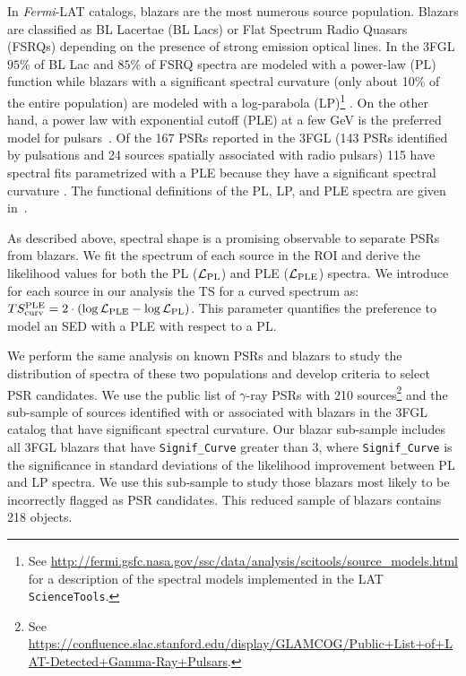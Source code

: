 \documentclass[iop]{emulateapj}
\begin{document}
In {\it Fermi}-LAT catalogs, blazars are the most numerous source
population.  Blazars are classified as BL Lacertae (BL Lacs) or Flat
Spectrum Radio Quasars (FSRQs) depending on the presence of strong
emission optical lines.  In the 3FGL $95\%$ of BL Lac and $85\%$ of
FSRQ spectra are modeled with a power-law (PL) function while blazars
with a significant spectral curvature (only about 10\% of the entire
population) are modeled with a log-parabola (LP)\footnote[7]{See
  \url{http://fermi.gsfc.nasa.gov/ssc/data/analysis/scitools/source\_models.html}
  for a description of the spectral models implemented in the LAT
  \texttt{ScienceTools}.}  
\citep[see, e.g.,][for a characterization of the {\it Fermi}
  blazar
  population]{2012ApJ...751..108A,DiMauro:2013zfa, Ackermann:2015yfk,Ghisellini:2017ico}. On
the other hand, a power law with exponential cutoff (PLE) at a few GeV
is the preferred model for pulsars~\citep{2013ApJS..208...17A}.  Of
the 167 PSRs reported in the 3FGL (143 PSRs identified by pulsations
and 24 sources spatially associated with radio pulsars) 115 have
spectral fits parametrized with a PLE because they have a significant
spectral curvature \citep[see, e.g.,][for a characterization
  of the $\gamma$-ray and radio pulsar
  population]{2004IAUS..218..105L,Calore:2014oga}.  The functional
definitions of the PL, LP, and PLE spectra are given
in~\citet{2015ApJS..218...23A}.

As described above, spectral shape is a promising observable to
separate PSRs from blazars.  We fit the spectrum of each source
in the ROI and derive the likelihood values for both the PL
($\mathcal{L}_{\rm{PL}}$) and PLE ($\mathcal{L}_{\rm{PLE}}$) spectra.
We introduce for each source in our analysis the TS for a curved
spectrum as:
$TS^{\rm{PLE}}_{\rm{curv}}=2\cdot(\log{\mathcal{L}_{\rm{PLE}}} -
\log{\mathcal{L}_{\rm{PL}}})$. This parameter quantifies the
preference to model an SED with a PLE with respect to a PL.

We perform the same analysis on known PSRs and blazars to study the
distribution of spectra of these two populations and develop criteria
to select PSR candidates.  We use the public list of $\gamma$-ray PSRs
with 210 sources\footnote[8]{See
  \url{https://confluence.slac.stanford.edu/display/GLAMCOG/Public+List+of+LAT-Detected+Gamma-Ray+Pulsars}.}
and the sub-sample of sources identified with or associated with
blazars in the 3FGL catalog that have significant spectral curvature.
Our blazar sub-sample includes all 3FGL blazars that have
\texttt{Signif\_Curve} greater than 3, where \texttt{Signif\_Curve} is
the significance in standard deviations of the likelihood improvement
between PL and LP spectra.  We use this sub-sample to study those
blazars most likely to be incorrectly flagged as PSR candidates.  This
reduced sample of blazars contains 218 objects.
\end{document}
